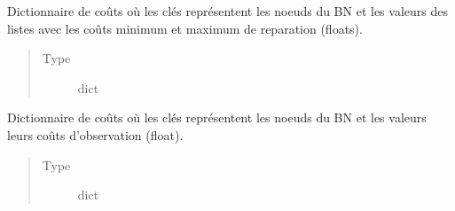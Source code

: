 \documentclass[letterpaper,10pt,french]{sphinxmanual}
\begin{document}
\begin{fulllineitems}
\begin{fulllineitems}
\begin{quote}
\begin{description}
\end{description}\end{quote}

\end{fulllineitems}


\begin{fulllineitems}
\label{\detokenize{index:DecisionTheoreticTroubleshooting.TroubleShootingProblem.costs_rep_interval}}
Dictionnaire de coûts où les clés représentent les
noeuds du BN et les valeurs des listes avec les coûts minimum et
maximum de reparation (floats).
\begin{quote}\begin{description}
\item[{Type}] \leavevmode
dict

\end{description}\end{quote}

\end{fulllineitems}


\begin{fulllineitems}
\label{\detokenize{index:DecisionTheoreticTroubleshooting.TroubleShootingProblem.costs_obs}}
Dictionnaire de coûts où les clés représentent les noeuds
du BN et les valeurs leurs coûts d’observation (float).
\begin{quote}\begin{description}
\item[{Type}] \leavevmode
dict

\end{description}\end{quote}

\end{fulllineitems}



\end{fulllineitems}
\end{document}
